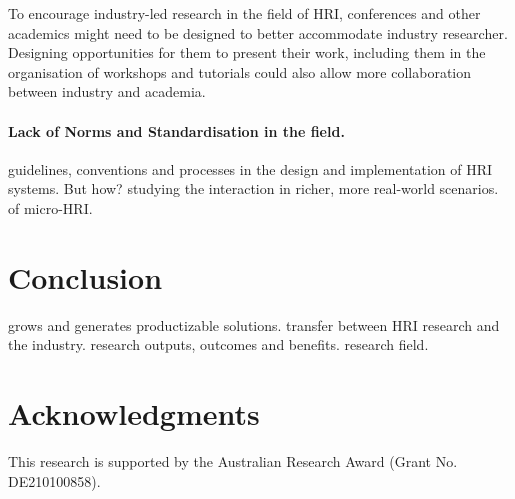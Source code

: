 \documentclass[letterpaper]{article} %
\begin{document}
To encourage industry-led research in the field of HRI, conferences and other academics might need to be designed to better accommodate industry researcher. Designing opportunities for them to present their work, including them in the organisation of workshops and tutorials could also allow more collaboration between industry and academia.

\paragraph{Lack of Norms and Standardisation in the field.}
 guidelines, conventions and processes in the design and implementation of HRI systems. But how?
 studying the interaction in richer, more real-world scenarios.
 of micro-HRI.


\section{Conclusion}
 grows and generates productizable solutions.
 transfer between HRI research and the industry.
 research outputs, outcomes and benefits.
 research field.



\clearpage


\section{Acknowledgments}
This research is supported by the Australian Research
 Award (Grant No. DE210100858).
\end{document}
